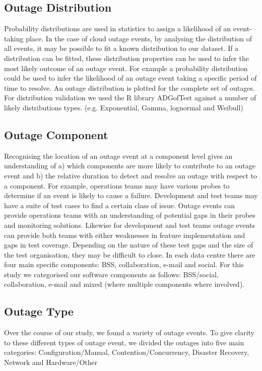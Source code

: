 \documentclass[conference]{IEEEtran}
\begin{document}
\subsection{Outage Distribution}

Probability distributions are used in statistics to assign a likelihood of an event-taking place. In the case of cloud outage events, by analysing the distribution of all events, it may be possible to fit a known distribution to our dataset. If a distribution can be fitted, these distribution properties can be used to infer the most likely outcome of an outage event. For example a probability distribution could be used to infer the likelihood of an outage event taking a specific period of time to resolve. An outage distribution is plotted for the complete set of outages. For distribution validation we used the R library ADGofTest \cite{ADGoF} against a number of likely distributions types. (e.g. Exponential, Gamma, lognormal and Weibull)

\subsection{Outage Component}

Recognising the location of an outage event at a component level gives an understanding of a) which components are more likely to contribute to an outage event and b) the relative duration to detect and resolve an outage with respect to a component. For example, operations teams may have various probes to determine if an event is likely to cause a failure. Development and test teams may have a suite of test cases to find a certain class of issue. Outage events can provide operations teams with an understanding of potential gaps in their probes and monitoring solutions. Likewise for development and test teams outage events can provide both teams with either weaknesses in feature implementation and gaps in test coverage. Depending on the nature of these test gaps and the size of the test organisation, they may be difficult to close. In each data centre there are four main specific components: BSS, collaboration, e-mail and social. For this study we categorised our software components as follows: BSS/social, collaboration, e-mail and mixed (where multiple components where involved). \par

\subsection{Outage Type}
Over the course of our study, we found a variety of outage events. To give clarity to these different types of outage event, we divided the outages into five main categories: Configuration/Manual, Contention/Concurrency, Disaster Recovery, Network and Hardware/Other \par
\end{document}
